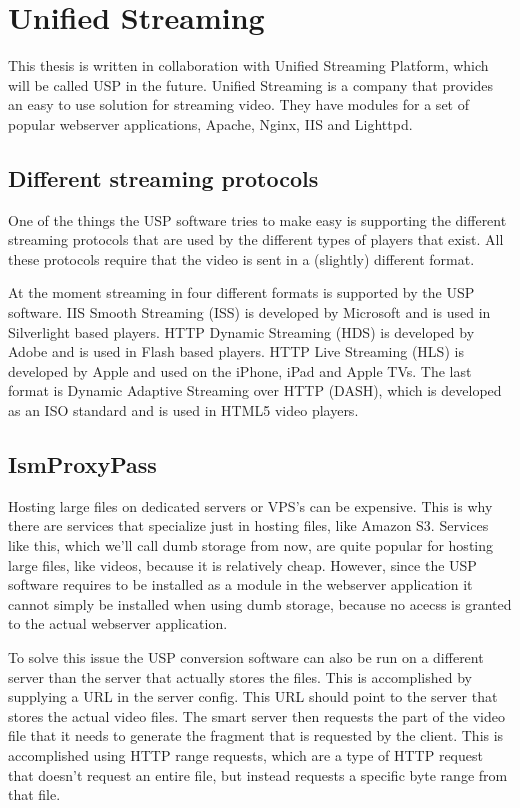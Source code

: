 \documentclass[twoside,openright]{uva-bachelor-thesis}
\begin{document}
\section{Unified Streaming}
This thesis is written in collaboration with Unified Streaming Platform, which
will be called USP in the future. Unified Streaming is a company that provides an easy to use
solution for streaming video. They have modules for a set of popular
webserver applications, Apache, Nginx, IIS and Lighttpd.


\subsection{Different streaming protocols}
One of the things the USP software tries to make easy is supporting the
different streaming protocols that are used by the different types of players
that exist. All these protocols require that the video is sent in a (slightly)
different format.

At the moment streaming in four different formats is supported by the USP
software. IIS Smooth Streaming (ISS) \autocite{smooth} is developed by
Microsoft and is used in Silverlight based players. HTTP Dynamic Streaming (HDS)
\autocite{hds} is developed by Adobe and is used in Flash based players. HTTP Live
Streaming (HLS) \autocite{hls} is developed by Apple and used on the iPhone, iPad
and Apple TVs. The last format is Dynamic Adaptive Streaming over HTTP (DASH),
which is developed as an ISO standard and is used in HTML5 video players.


\subsection{IsmProxyPass}
Hosting large files on dedicated servers or VPS's can be expensive. This is why
there are services that specialize just in hosting files, like Amazon S3.
Services like this, which we'll call dumb storage from now, are quite popular
for hosting large files, like videos, because it is relatively cheap. However,
since the USP software requires to be installed as a module in the webserver
application it cannot simply be installed when using dumb storage, because no
acecss is granted to the actual webserver application.

To solve this issue the USP conversion software can also be run on a different
server than the server that actually stores the files. This is accomplished by
supplying a URL in the server config. This URL should point to the server that
stores the actual video files. The smart server then requests the part of the
video file that it needs to generate the fragment that is requested by the
client. This is accomplished using HTTP range requests\autocite{rangerequests},
which are a type of HTTP request that doesn't request an entire file, but
instead requests a specific byte range from that file.
\end{document}
